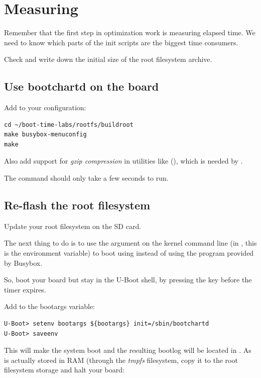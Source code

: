 
\section{Measuring}

Remember that the first step in optimization work is measuring elapsed
time. We need to know which parts of the init scripts are the biggest
time consumers.

Check and write down the initial size of the root filesystem archive.

\subsection{Use bootchartd on the board}

Add  to your  configuration:

\begin{verbatim}
cd ~/boot-time-labs/rootfs/buildroot
make busybox-menuconfig
make
\end{verbatim}

Also add support for {\em gzip compression} in utilities like 
(), which is needed by .

The  command should only take a few seconds to run.

\subsection{Re-flash the root filesystem}

Update your root filesystem on the SD card.

The next thing to do is to use the  argument on the
kernel command line (in , this is the 
environment variable) to boot using  instead of using
the  program provided by Busybox.

So, boot your board but stay in the U-Boot shell, by pressing the
 key before the timer expires.

Add  to the bootargs variable:
\begin{verbatim}
U-Boot> setenv bootargs ${bootargs} init=/sbin/bootchartd
U-Boot> saveenv
\end{verbatim}

This will make the system boot and the resulting bootlog will be located
in . As  is actually stored in
RAM (through the {\em tmpfs} filesystem, copy it to the root filesystem
storage and halt your board:

